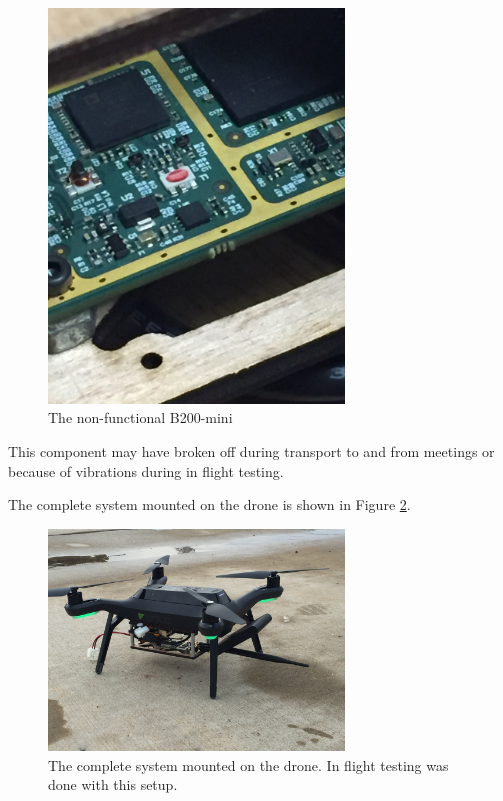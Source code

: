 \begin{figure}[ht!]
	\centering
	\includegraphics[width=0.70\textwidth]{img/broken_mini.jpg}
	\caption{The non-functional B200-mini}
	\label{fig:broken_mini}
\end{figure}\par
This component may have broken off during transport to and from meetings or because of vibrations during in flight testing. \par

The complete system mounted on the drone is shown in Figure \ref{fig:drone_and_box}.
\begin{figure}[ht!]
	\centering
	\includegraphics[width=0.70\textwidth]{img/drone_and_box.jpg}
	\caption{The complete system mounted on the drone. In flight testing was done with this setup.}
	\label{fig:drone_and_box}
\end{figure}\par

